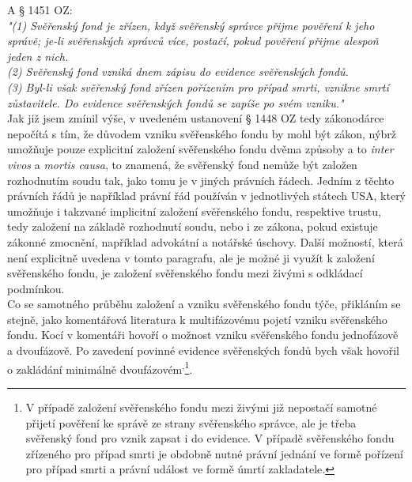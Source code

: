 \documentclass{article}
\begin{document}
A § 1451 OZ:\\

\noindent\textit{"(1) Svěřenský fond je zřízen, když svěřenský správce přijme pověření k jeho správě; je-li svěřenských správců více, postačí, pokud pověření přijme alespoň jeden z nich.\\
(2) Svěřenský fond vzniká dnem zápisu do evidence svěřenských fondů.\\
(3) Byl-li však svěřenský fond zřízen pořízením pro případ smrti, vznikne smrtí zůstavitele. Do evidence svěřenských fondů se zapíše po svém vzniku."}\\

Jak již jsem zmínil výše, v uvedeném ustanovení § 1448 OZ tedy zákonodárce nepočítá s tím, že důvodem vzniku svěřenského fondu by mohl být zákon, nýbrž umožňuje pouze explicitní založení svěřenského fondu dvěma způsoby a to \textit{inter vivos} a \textit{mortis causa}, to znamená, že svěřenský fond nemůže být založen rozhodnutím soudu tak, jako tomu je v jiných právních řádech. Jedním z těchto právních řádů je například právní řád používán v jednotlivých státech USA, který umožňuje i takzvané implicitní založení svěřenského fondu, respektive trustu, tedy založení na základě rozhodnutí soudu, nebo i ze zákona, pokud existuje zákonné zmocnění, například advokátní a notářské úschovy. Další možností, která není explicitně uvedena v tomto paragrafu, ale je možné ji využít k založení svěřenského fondu, je založení svěřenského fondu mezi živými s odkládací podmínkou.\\

Co se samotného průběhu založení a vzniku svěřenského fondu týče, přikláním se stejně, jako komentářová literatura k multifázovému pojetí vzniku svěřenského fondu. Kocí v komentáři hovoří o možnost vzniku svěřenského fondu jednofázově a dvoufázově. Po zavedení povinné evidence svěřenských fondů bych však hovořil o zakládání minimálně dvoufázovém\textsuperscript{,}\footnote{V případě založení svěřenského fondu mezi živými již nepostačí samotné přijetí pověření ke správě ze strany svěřenského správce, ale je třeba svěřenský fond pro vznik zapsat i do evidence. V případě svěřenského fondu zřízeného pro případ smrti je obdobně nutné právní jednání ve formě pořízení pro případ smrti a právní událost ve formě úmrtí zakladatele.}.\\
\end{document}
